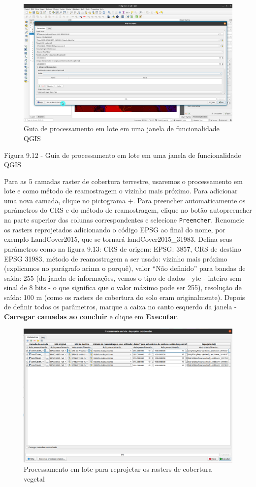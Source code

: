 \documentclass[
]{book}
\begin{document}
\begin{figure}
\centering
\includegraphics{media/modulo9/fig912.png}
\caption{Guia de processamento em lote em uma janela de funcionalidade QGIS}
\end{figure}

Figura 9.12 - Guia de processamento em lote em uma janela de funcionalidade QGIS

Para as 5 camadas raster de cobertura terrestre, usaremos o processamento em lote e como método de reamostragem o vizinho mais próximo. Para adicionar uma nova camada, clique no pictograma +. Para preencher automaticamente os parâmetros do CRS e do método de reamostragem, clique no botão autopreencher na parte superior das colunas correspondentes e selecione \texttt{Preencher}. Renomeie os rasters reprojetados adicionando o código EPSG ao final do nome, por exemplo LandCover2015, que se tornará landCover2015\_31983. Defina seus parâmetros como na figura 9.13: CRS de origem: EPSG: 3857, CRS de destino EPSG 31983, método de reamostragem a ser usado: vizinho mais próximo (explicamos no parágrafo acima o porquê), valor ``Não definido'' para bandas de saída: 255 (da janela de informações, vemos o tipo de dados - yte - inteiro sem sinal de 8 bits - o que significa que o valor máximo pode ser 255), resolução de saída: 100 m (como os rasters de cobertura do solo eram originalmente). Depois de definir todos os parâmetros, marque a caixa no canto esquerdo da janela - \textbf{Carregar camadas ao concluir} e clique em \textbf{Executar}.

\begin{figure}
\centering
\includegraphics{media/modulo9/fig913_a.png}
\caption{Processamento em lote para reprojetar os rasters de cobertura vegetal}
\end{figure}
\end{document}
